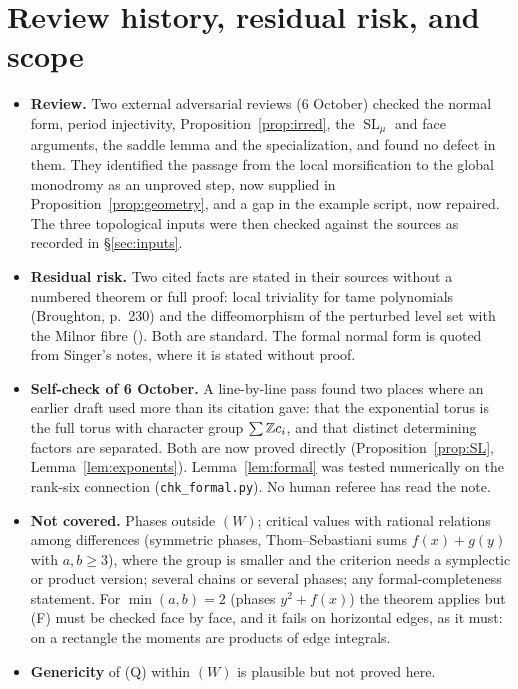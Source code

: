 \documentclass[11pt]{article}
\numberwithin{equation}{section}
\theoremstyle{definition}
\theoremstyle{remark}
\newcommand{\SL}{\operatorname{SL}}\newcommand{\GL}{\operatorname{GL}}\newcommand{\PGL}{\operatorname{PGL}}
\begin{document}
\section{Review history, residual risk, and scope}\label{sec:risk}
\begin{itemize}[leftmargin=1.6em]
\item \textbf{Review.} Two external adversarial reviews (6 October) checked the
 normal form, period injectivity, Proposition~\ref{prop:irred}, the
 $\SL_\mu$ and face arguments, the saddle lemma and the specialization, and
 found no defect in them. They identified the passage from the local
 morsification to the global monodromy as an unproved step, now supplied in
 Proposition~\ref{prop:geometry}, and a gap in the example script, now
 repaired. The three topological inputs were then checked against the sources
 as recorded in \S\ref{sec:inputs}.
\item \textbf{Residual risk.} Two cited facts are stated in their sources
 without a numbered theorem or full proof: local triviality for tame
 polynomials (Broughton, p.~230) and the diffeomorphism of the perturbed level
 set with the Milnor fibre (\cite[\S2.1]{AGV}). Both are standard. The formal normal
 form is quoted from Singer's notes, where it is stated without proof.
\item \textbf{Self-check of 6 October.} A line-by-line pass found two places
 where an earlier draft used more than its citation gave: that the exponential
 torus is the full torus with character group $\sum\mathbb Z c_i$, and that distinct
 determining factors are separated. Both are now proved directly
 (Proposition~\ref{prop:SL}, Lemma~\ref{lem:exponents}). Lemma~\ref{lem:formal}
 was tested numerically on the rank-six connection (\texttt{chk\_formal.py}). No human referee has read the note.
\item \textbf{Not covered.} Phases outside $(W)$; critical values with rational
 relations among differences (symmetric phases, Thom--Sebastiani sums
 $f(x)+g(y)$ with $a,b\ge3$), where the group is smaller and the criterion needs
 a symplectic or product version; several chains or several phases; any
 formal-completeness statement. For $\min(a,b)=2$ (phases $y^2+f(x)$) the
 theorem applies but (F) must be checked face by face, and it fails on
 horizontal edges, as it must: on a rectangle the moments are products of edge
 integrals.
\item \textbf{Genericity} of (Q) within $(W)$ is plausible but not proved here.
\end{itemize}
\end{document}
